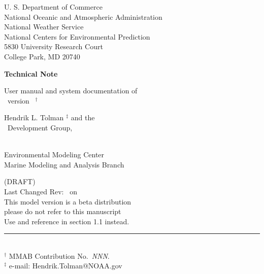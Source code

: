 
\pagestyle{empty}

\begin{center} 
U. S. Department of Commerce \\
National Oceanic and Atmospheric Administration \\
National Weather Service \\
National Centers for Environmental Prediction \\
5830 University Research Court \\
College Park, MD 20740


\vspace{15mm}

{\bf Technical Note}

\vspace{15mm}

{\large User manual and system documentation of \\
\ww\ version \WWver\ $^\dag$} \\

\vspace{15mm}

Hendrik L. Tolman $^\ddag$ and the \\
\ww\ Development Group, \\
\strut \\
Environmental Modeling Center \\
Marine Modeling and Analysis Branch

\vfill

(DRAFT) \\
Last Changed Rev: \SVNRevision\ on \SVNDate \\
\vspace{\baselineskip}
This model version is a beta distribution \\
{\sc please do not refer to this manuscript} \\
Use \cite{tol:MMAB09a} and reference in section 1.1 instead.


\vfill

\end{center}
\noindent \rule{140mm}{0.5mm} \\
{\small $^\dag$ MMAB Contribution No.~{\it NNN}. \\
$^\ddag$ e-mail: Hendrik.Tolman@NOAA.gov}

